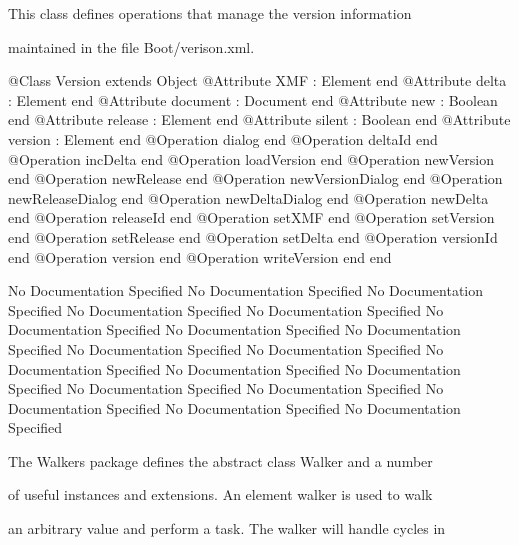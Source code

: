       This class defines operations that manage the version information

      maintained in the file Boot/verison.xml.
\begin{Interface}
@Class Version extends Object
  @Attribute XMF : Element end
  @Attribute delta : Element end
  @Attribute document : Document end
  @Attribute new : Boolean end
  @Attribute release : Element end
  @Attribute silent : Boolean end
  @Attribute version : Element end
  @Operation dialog end
  @Operation deltaId end
  @Operation incDelta end
  @Operation loadVersion end
  @Operation newVersion end
  @Operation newRelease end
  @Operation newVersionDialog end
  @Operation newReleaseDialog end
  @Operation newDeltaDialog end
  @Operation newDelta end
  @Operation releaseId end
  @Operation setXMF end
  @Operation setVersion end
  @Operation setRelease end
  @Operation setDelta end
  @Operation versionId end
  @Operation version end
  @Operation writeVersion end
end
\end{Interface}
No Documentation Specified
No Documentation Specified
No Documentation Specified
No Documentation Specified
No Documentation Specified
No Documentation Specified
No Documentation Specified
No Documentation Specified
No Documentation Specified
No Documentation Specified
No Documentation Specified
No Documentation Specified
No Documentation Specified
No Documentation Specified
No Documentation Specified
No Documentation Specified
No Documentation Specified
No Documentation Specified

      The Walkers package defines the abstract class Walker and a number

      of useful instances and extensions. An element walker is used to walk

      an arbitrary value and perform a task. The walker will handle cycles in

